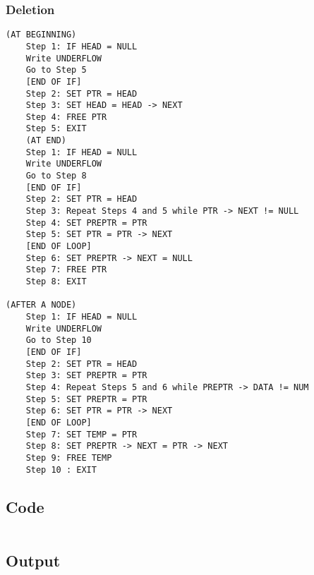 \subsubsection{Deletion}
\begin{lstlisting}[style=mystyle]
(AT BEGINNING)
    Step 1: IF HEAD = NULL
    Write UNDERFLOW
    Go to Step 5
    [END OF IF]
    Step 2: SET PTR = HEAD
    Step 3: SET HEAD = HEAD -> NEXT
    Step 4: FREE PTR
    Step 5: EXIT
    (AT END)
    Step 1: IF HEAD = NULL
    Write UNDERFLOW
    Go to Step 8
    [END OF IF]
    Step 2: SET PTR = HEAD
    Step 3: Repeat Steps 4 and 5 while PTR -> NEXT != NULL
    Step 4: SET PREPTR = PTR
    Step 5: SET PTR = PTR -> NEXT
    [END OF LOOP]
    Step 6: SET PREPTR -> NEXT = NULL
    Step 7: FREE PTR
    Step 8: EXIT

(AFTER A NODE)
    Step 1: IF HEAD = NULL
    Write UNDERFLOW
    Go to Step 10
    [END OF IF]
    Step 2: SET PTR = HEAD
    Step 3: SET PREPTR = PTR
    Step 4: Repeat Steps 5 and 6 while PREPTR -> DATA != NUM
    Step 5: SET PREPTR = PTR
    Step 6: SET PTR = PTR -> NEXT
    [END OF LOOP]
    Step 7: SET TEMP = PTR
    Step 8: SET PREPTR -> NEXT = PTR -> NEXT
    Step 9: FREE TEMP
    Step 10 : EXIT
\end{lstlisting}

\subsection{Code}
\inputminted[]{c}{../../Code/linkedListOperations.c}

\subsection{Output}
\begin{lstlisting}[style=output]
\end{lstlisting}

\pagebreak

